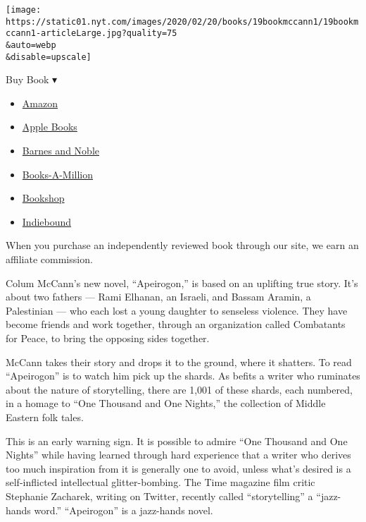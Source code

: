 \texttt{[image: https://static01.nyt.com/images/2020/02/20/books/19bookmccann1/19bookmccann1-articleLarge.jpg?quality=75\\\&auto=webp\\\&disable=upscale]}

Buy Book ▾

\begin{itemize}
\tightlist
\item
  \href{https://www.amazon.com/gp/search?index=books\&tag=NYTBSREV-20\&field-keywords=Apeirogon+Colum+McCann}{Amazon}
\item
  \href{https://du-gae-books-dot-nyt-du-prd.appspot.com/buy?title=Apeirogon\&author=Colum+McCann}{Apple
  Books}
\item
  \href{https://www.anrdoezrs.net/click-7990613-11819508?url=https\%3A\%2F\%2Fwww.barnesandnoble.com\%2Fw\%2F\%3Fean\%3D9781400069606}{Barnes
  and Noble}
\item
  \href{https://www.anrdoezrs.net/click-7990613-35140?url=https\%3A\%2F\%2Fwww.booksamillion.com\%2Fp\%2FApeirogon\%2FColum\%2BMcCann\%2F9781400069606}{Books-A-Million}
\item
  \href{https://bookshop.org/a/3546/9781400069606}{Bookshop}
\item
  \href{https://www.indiebound.org/book/9781400069606?aff=NYT}{Indiebound}
\end{itemize}

When you purchase an independently reviewed book through our site, we
earn an affiliate commission.

Colum McCann's new novel, ``Apeirogon,'' is based on an uplifting true
story. It's about two fathers --- Rami Elhanan, an Israeli, and Bassam
Aramin, a Palestinian --- who each lost a young daughter to senseless
violence. They have become friends and work together, through an
organization called Combatants for Peace, to bring the opposing sides
together.

McCann takes their story and drops it to the ground, where it shatters.
To read ``Apeirogon'' is to watch him pick up the shards. As befits a
writer who ruminates about the nature of storytelling, there are 1,001
of these shards, each numbered, in a homage to ``One Thousand and One
Nights,'' the collection of Middle Eastern folk tales.

This is an early warning sign. It is possible to admire ``One Thousand
and One Nights'' while having learned through hard experience that a
writer who derives too much inspiration from it is generally one to
avoid, unless what's desired is a self-inflicted intellectual
glitter-bombing. The Time magazine film critic Stephanie Zacharek,
writing on Twitter, recently called ``storytelling'' a ``jazz-hands
word.'' ``Apeirogon'' is a jazz-hands novel.

